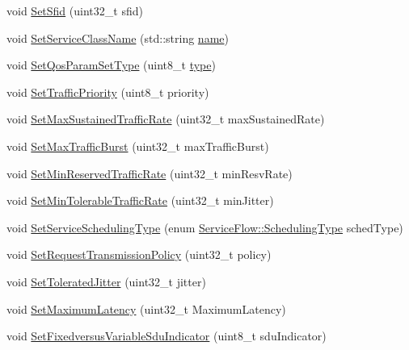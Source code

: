 \begin{DoxyCompactItemize}
\item 
void \hyperlink{classns3_1_1ServiceFlow_a1708510e6b5769fd3086097dc657571f}{Set\+Sfid} (uint32\+\_\+t sfid)
\item 
void \hyperlink{classns3_1_1ServiceFlow_a36703f0e432401abc613d19db353e3ff}{Set\+Service\+Class\+Name} (std\+::string \hyperlink{generate__test__data__lte__spectrum__model_8m_ab74e6bf80237ddc4109968cedc58c151}{name})
\item 
void \hyperlink{classns3_1_1ServiceFlow_a6b3b43af958dcbe0a2be4d8535bf3b31}{Set\+Qos\+Param\+Set\+Type} (uint8\+\_\+t \hyperlink{visualizer-ideas_8txt_add98db9e15e2a58cf2b57623e7aa893a}{type})
\item 
void \hyperlink{classns3_1_1ServiceFlow_a9fd37b11439e3b6ca601c76e54d6273c}{Set\+Traffic\+Priority} (uint8\+\_\+t priority)
\item 
void \hyperlink{classns3_1_1ServiceFlow_aef578837096b1a316696a88ecd550e7c}{Set\+Max\+Sustained\+Traffic\+Rate} (uint32\+\_\+t max\+Sustained\+Rate)
\item 
void \hyperlink{classns3_1_1ServiceFlow_a586065681c386771f441a51f469fab03}{Set\+Max\+Traffic\+Burst} (uint32\+\_\+t max\+Traffic\+Burst)
\item 
void \hyperlink{classns3_1_1ServiceFlow_ad49e9a793508d2d476de1e08897ecbf6}{Set\+Min\+Reserved\+Traffic\+Rate} (uint32\+\_\+t min\+Resv\+Rate)
\item 
void \hyperlink{classns3_1_1ServiceFlow_aafc2368b8dab5d394635fa9f7fe281af}{Set\+Min\+Tolerable\+Traffic\+Rate} (uint32\+\_\+t min\+Jitter)
\item 
void \hyperlink{classns3_1_1ServiceFlow_acdef049af2eda0d1ac80047208ce7571}{Set\+Service\+Scheduling\+Type} (enum \hyperlink{classns3_1_1ServiceFlow_a7990ba10be1e098328fd1e6382a26235}{Service\+Flow\+::\+Scheduling\+Type} sched\+Type)
\item 
void \hyperlink{classns3_1_1ServiceFlow_a08fdadfa5d691da427aeb3a3c3d39418}{Set\+Request\+Transmission\+Policy} (uint32\+\_\+t policy)
\item 
void \hyperlink{classns3_1_1ServiceFlow_ac0b518b161e85317c141416712197f99}{Set\+Tolerated\+Jitter} (uint32\+\_\+t jitter)
\item 
void \hyperlink{classns3_1_1ServiceFlow_a61781dc767b833dfc34ed86e9efbc62d}{Set\+Maximum\+Latency} (uint32\+\_\+t Maximum\+Latency)
\item 
void \hyperlink{classns3_1_1ServiceFlow_ae8df3a85b6d46eabbd7829829d142600}{Set\+Fixedversus\+Variable\+Sdu\+Indicator} (uint8\+\_\+t sdu\+Indicator)
\item 

\end{DoxyCompactItemize}
